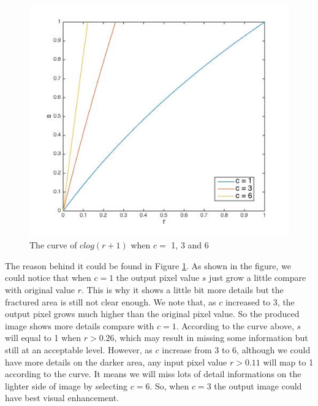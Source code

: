 \begin{figure}[h]
	\centering
	\includegraphics[scale=0.4]{log136}
	\caption{The curve of $clog(r + 1)$ when $c =$ 1, 3 and 6}
	\label{fig:curvelog}
\end{figure}

The reason behind it could be found in Figure \ref{fig:curvelog}. As shown in the figure, we could notice that when $c = 1$ the output pixel value $s$ just grow a little compare with original value $r$. This is why it shows a little bit more details but the fractured area is still not clear enough. We note that, as $c$ increased to 3, the output pixel grows much higher than the original pixel value. So the produced image shows more details compare with $c = 1$. According to the curve above, $s$ will equal to 1 when $r > 0.26$, which may result in missing some information but still at an acceptable level. However, as $c$ increase from 3 to 6, although we could have more details on the darker area, any input pixel value $r > 0.11$ will map to 1 according to the curve. It means we will miss lots of detail informations on the lighter side of image by selecting $c = 6$. So, when $c = 3$ the output image could have best visual enhancement.

